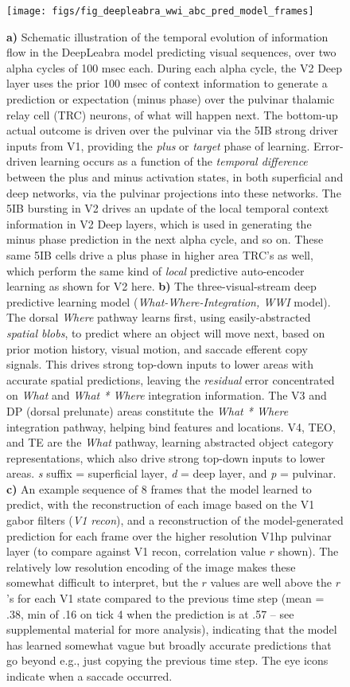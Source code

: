 \documentclass[11pt,twoside]{article}
\newif\myifpdf
\begin{document}
\begin{figure}
  \centering\texttt{[image: figs/fig\_deepleabra\_wwi\_abc\_pred\_model\_frames]}
  \caption{\small {\bf a)} Schematic illustration of the temporal evolution of information flow in the DeepLeabra model predicting visual sequences, over two alpha cycles of 100 msec each.  During each alpha cycle, the V2 Deep layer uses the prior 100 msec of context information to generate a prediction or expectation (minus phase) over the pulvinar thalamic relay cell (TRC) neurons, of what will happen next.  The bottom-up actual outcome is driven over the pulvinar via the 5IB strong driver inputs from V1, providing the {\em plus} or {\em target} phase of learning.  Error-driven learning occurs as a function of the {\em temporal difference} between the plus and minus activation states, in both superficial and deep networks, via the pulvinar projections into these networks.  The 5IB bursting in V2 drives an update of the local temporal context information in V2 Deep layers, which is used in generating the minus phase prediction in the next alpha cycle, and so on.  These same 5IB cells drive a plus phase in higher area TRC's as well, which perform the same kind of {\em local} predictive auto-encoder learning as shown for V2 here.  {\bf b)} The three-visual-stream deep predictive learning model ({\em What-Where-Integration, WWI} model). The dorsal {\em Where} pathway learns first, using easily-abstracted {\em spatial blobs}, to predict where an object will move next, based on prior motion history, visual motion, and saccade efferent copy signals.  This drives strong top-down inputs to lower areas with accurate spatial predictions, leaving the {\em residual} error concentrated on {\em What} and {\em What * Where} integration information.  The V3 and DP (dorsal prelunate) areas constitute the {\em What * Where} integration pathway, helping bind features and locations.  V4, TEO, and TE are the {\em What} pathway, learning abstracted object category representations, which also drive strong top-down inputs to lower areas.  {\em s} suffix = superficial layer, {\em d} = deep layer, and {\em p} = pulvinar.  {\bf c)} An example sequence of 8 frames that the model learned to predict, with the reconstruction of each image based on the V1 gabor filters ({\em V1 recon}), and a reconstruction of the model-generated prediction for each frame over the higher resolution V1hp pulvinar layer (to compare against V1 recon, correlation value $r$ shown).  The relatively low resolution encoding of the image makes these somewhat difficult to interpret, but the $r$ values are well above the $r$'s for each V1 state compared to the previous time step (mean = .38, min of .16 on tick 4 when the prediction is at .57 -- see supplemental material for more analysis), indicating that the model has learned somewhat vague but broadly accurate predictions that go beyond e.g., just copying the previous time step.  The eye icons indicate when a saccade occurred.}
  \label{fig.model}
\end{figure}
\end{document}
